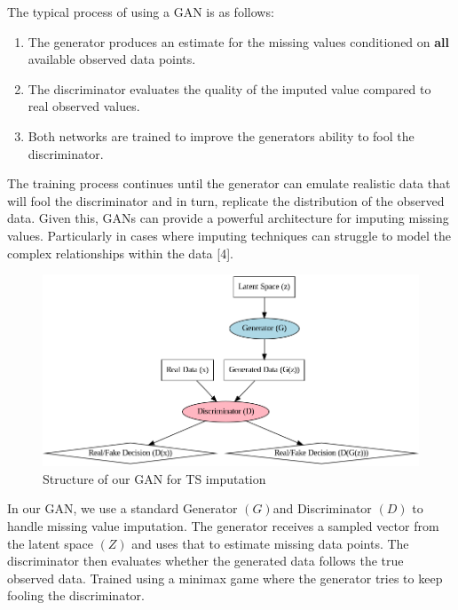 \documentclass[
]{report}
\begin{document}
The typical process of using a GAN is as follows:

\begin{enumerate}
\def\labelenumi{\arabic{enumi})}
\item
  The generator produces an estimate for the missing values conditioned
  on \textbf{all} available observed data points.
\item
  The discriminator evaluates the quality of the imputed value compared
  to real observed values.
\item
  Both networks are trained to improve the generators ability to fool
  the discriminator.
\end{enumerate}

The training process continues until the generator can emulate realistic
data that will fool the discriminator and in turn, replicate the
distribution of the observed data. Given this, GANs can provide a
powerful architecture for imputing missing values. Particularly in cases
where imputing techniques can struggle to model the complex
relationships within the data {[}4{]}.

\begin{figure}[h]
\centering
\includegraphics[width=\textwidth]{graphs/gan_architecture.png}


\caption{Structure of our GAN for TS imputation}
\label{fig:Structure_of_gan}  %
\end{figure}

In our GAN, we use a standard Generator \((G)\)and Discriminator \((D)\)
to handle missing value imputation. The generator receives a sampled
vector from the latent space \((Z)\) and uses that to estimate missing
data points. The discriminator then evaluates whether the generated data
follows the true observed data. Trained using a minimax game where the
generator tries to keep fooling the discriminator.
\end{document}
